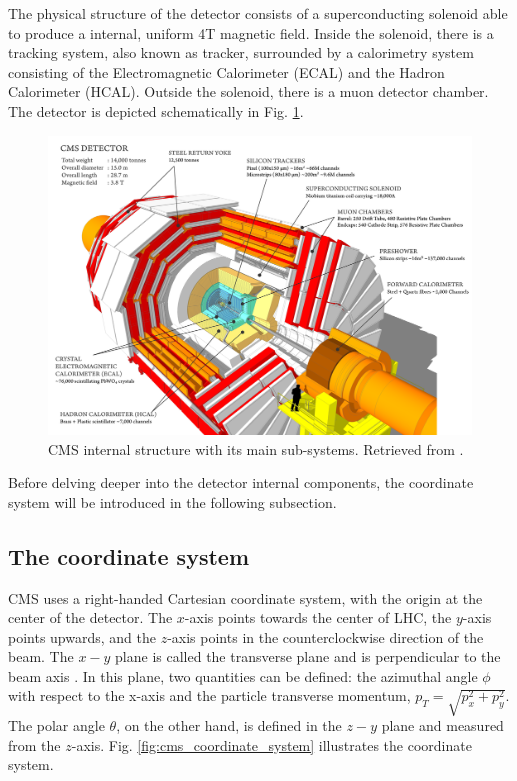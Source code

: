 The physical structure of the detector consists of a superconducting solenoid able to produce a internal, uniform 4T magnetic field. Inside the solenoid, there is a tracking system, also known as tracker, surrounded by a calorimetry system consisting of the Electromagnetic Calorimeter (ECAL) and the Hadron Calorimeter (HCAL). Outside the solenoid, there is a muon detector chamber. The detector is depicted schematically in Fig. \ref{fig:CMS_structure}.

\begin{figure}[htp!]
	\centering
	\includegraphics[scale=0.2]{MainContent/Figs/cms_structure.png}
	\caption{CMS internal structure with its main sub-systems. Retrieved from \cite{sanchez2020search}.}
	\label{fig:CMS_structure}
\end{figure}


Before delving deeper into the detector internal components, the coordinate system will be introduced in the following subsection.

\subsection{The coordinate system}
CMS uses a right-handed Cartesian coordinate system, with the origin at the center of the detector. The $x$-axis points towards the center of LHC, the $y$-axis points upwards, and the $z$-axis points in the counterclockwise direction of the beam. The $x-y$ plane is called the transverse plane and is perpendicular to the beam axis \cite{baron2018desarrollo, sanchez2020search, lechner2021measurement}. In this plane, two quantities can be defined: the azimuthal angle $\phi$ with respect to the x-axis and the particle transverse momentum, $p_T = \sqrt{p_x^2 + p_y^2}$. The polar angle $\theta$, on the other hand, is defined in the $z-y$ plane and measured from the $z$-axis. Fig. \ref{fig:cms_coordinate_system} illustrates the coordinate system.


